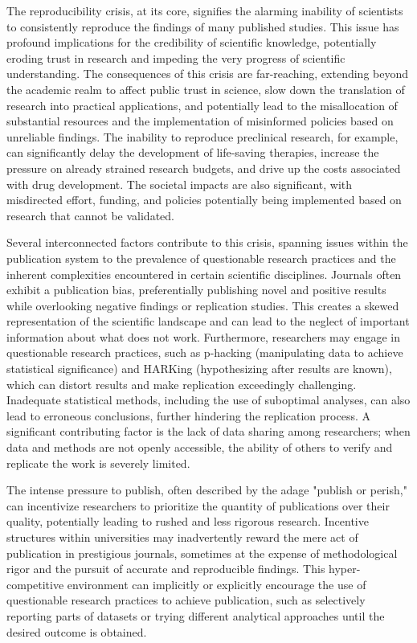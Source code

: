 \documentclass{article}
\begin{document}
The reproducibility crisis, at its core, signifies the alarming inability of scientists to consistently reproduce the findings of many published studies. This issue has profound implications for the credibility of scientific knowledge, potentially eroding trust in research and impeding the very progress of scientific understanding. The consequences of this crisis are far-reaching, extending beyond the academic realm to affect public trust in science, slow down the translation of research into practical applications, and potentially lead to the misallocation of substantial resources and the implementation of misinformed policies based on unreliable findings. The inability to reproduce preclinical research, for example, can significantly delay the development of life-saving therapies, increase the pressure on already strained research budgets, and drive up the costs associated with drug development. The societal impacts are also significant, with misdirected effort, funding, and policies potentially being implemented based on research that cannot be validated.

Several interconnected factors contribute to this crisis, spanning issues within the publication system to the prevalence of questionable research practices and the inherent complexities encountered in certain scientific disciplines. Journals often exhibit a publication bias, preferentially publishing novel and positive results while overlooking negative findings or replication studies. This creates a skewed representation of the scientific landscape and can lead to the neglect of important information about what does not work. Furthermore, researchers may engage in questionable research practices, such as p-hacking (manipulating data to achieve statistical significance) and HARKing (hypothesizing after results are known), which can distort results and make replication exceedingly challenging. Inadequate statistical methods, including the use of suboptimal analyses, can also lead to erroneous conclusions, further hindering the replication process. A significant contributing factor is the lack of data sharing among researchers; when data and methods are not openly accessible, the ability of others to verify and replicate the work is severely limited.

The intense pressure to publish, often described by the adage "publish or perish," can incentivize researchers to prioritize the quantity of publications over their quality, potentially leading to rushed and less rigorous research. Incentive structures within universities may inadvertently reward the mere act of publication in prestigious journals, sometimes at the expense of methodological rigor and the pursuit of accurate and reproducible findings. This hyper-competitive environment can implicitly or explicitly encourage the use of questionable research practices to achieve publication, such as selectively reporting parts of datasets or trying different analytical approaches until the desired outcome is obtained.
\end{document}
